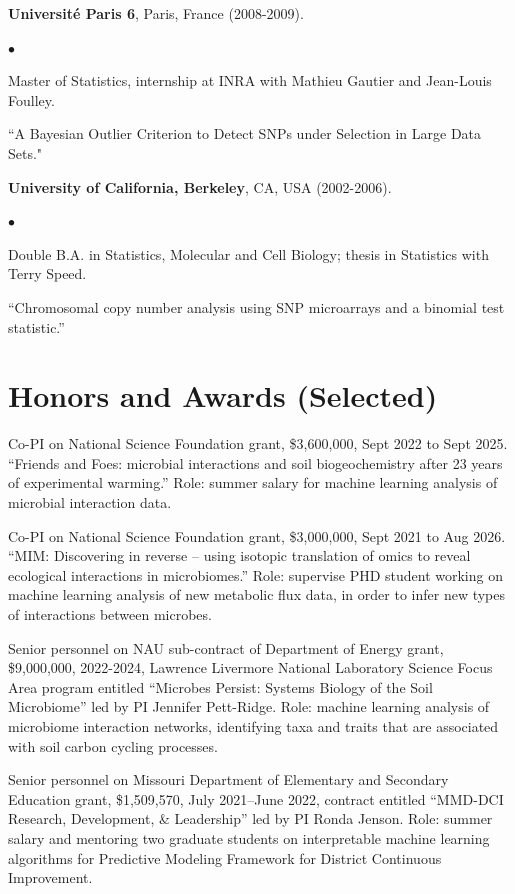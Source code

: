 \documentclass[margin,line]{res}
\newenvironment{list2}{
  \begin{list}{$\bullet$}{%
      \setlength{\itemsep}{0in}
      \setlength{\parsep}{0in} \setlength{\parskip}{0in}
      \setlength{\topsep}{0in} \setlength{\partopsep}{0in} 
      \setlength{\leftmargin}{0.2in}}}{\end{list}}
\begin{document}
\begin{resume}
{\bf Universit\'e Paris 6}, Paris, France (2008-2009).\\
\vspace*{-.1in}
\begin{list2}
\item[] Master of Statistics, internship at INRA with Mathieu Gautier and Jean-Louis Foulley.
\item[] ``A Bayesian Outlier Criterion to Detect SNPs under Selection in Large Data Sets."
\end{list2}

{\bf University of California, Berkeley}, CA, USA (2002-2006).\\
\vspace*{-.1in}
\begin{list2}
\item[] Double B.A. in Statistics, Molecular and Cell Biology; thesis in Statistics with Terry Speed.
\item[] ``Chromosomal copy number analysis using SNP microarrays and a binomial test statistic.'' 
\end{list2}

\section{\sc Honors and Awards (Selected)}

Co-PI on National Science Foundation grant, \$3,600,000, Sept 2022 to
Sept 2025. ``Friends and Foes: microbial interactions and soil
biogeochemistry after 23 years of experimental warming.'' Role: summer
salary for machine learning analysis of microbial interaction data.

Co-PI on National Science Foundation grant, \$3,000,000, Sept 2021 to
Aug 2026. ``MIM: Discovering in reverse – using isotopic translation
of omics to reveal ecological interactions in microbiomes.'' Role:
supervise PHD student working on machine learning analysis of new
metabolic flux data, in order to infer new types of interactions
between microbes.

Senior personnel on NAU sub-contract of Department of Energy grant,
\$9,000,000, 2022-2024, Lawrence Livermore National Laboratory
Science Focus Area program entitled ``Microbes Persist: Systems
Biology of the Soil Microbiome'' led by PI Jennifer
Pett-Ridge. Role: machine learning analysis of microbiome
interaction networks, identifying taxa and traits that are associated
with soil carbon cycling processes.

Senior personnel on Missouri Department of Elementary and Secondary
Education grant, \$1,509,570, July 2021--June 2022, contract entitled
``MMD-DCI Research, Development, \& Leadership'' led by PI Ronda
Jenson. Role: summer salary and mentoring two graduate students on
interpretable machine learning algorithms for Predictive Modeling
Framework for District Continuous Improvement.


\end{resume}
\end{document}
